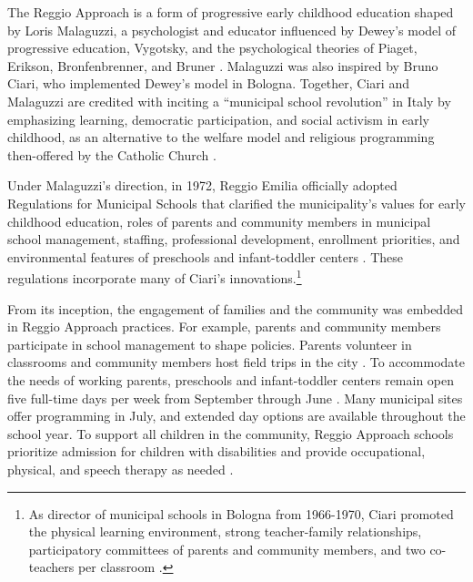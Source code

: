 The Reggio Approach is a form of progressive early childhood education shaped by Loris Malaguzzi, a psychologist and educator influenced by Dewey's model of progressive education, Vygotsky, and the psychological theories of Piaget, Erikson, Bronfenbrenner, and Bruner \citep{Rinaldi_2006_ReggioEmilia_BOOK,Cagliari-etal-eds_2016_BOOK_Loris-Malaguzzi}. Malaguzzi was also inspired by Bruno Ciari, who implemented Dewey's model in Bologna. Together, Ciari and Malaguzzi are credited with inciting a ``municipal school revolution'' in Italy by emphasizing learning, democratic participation, and social activism in early childhood, as an alternative to the welfare model and religious programming then-offered by the Catholic Church \citep{Lazzari_2012_Euro-J-Edu,Cagliari-etal-eds_2016_BOOK_Loris-Malaguzzi}.

Under Malaguzzi's direction, in 1972, Reggio Emilia officially adopted Regulations for Municipal Schools that clarified the municipality's values for early childhood education, roles of parents and community members in municipal school management, staffing, professional development, enrollment priorities, and environmental features of preschools and infant-toddler centers \citep{Giaroni_1972_Regulations-Municipal-EC-Schools}. These regulations incorporate many of Ciari's innovations.\footnote{As director of municipal schools in Bologna from 1966-1970, Ciari promoted the physical learning environment, strong teacher-family relationships, participatory committees of parents and community members, and two co-teachers per classroom \citep{Edwards-etal-eds_1998_Hundred-Languages}.} 

From its inception, the engagement of families and the community was embedded in Reggio Approach practices. For example, parents and community members participate in school management to shape policies. Parents volunteer in classrooms and community members host field trips in the city \citep{CEHD_2016_Historical-Analysis,Cagliari-etal-eds_2016_BOOK_Loris-Malaguzzi}. To accommodate the needs of working parents, preschools and infant-toddler centers remain open five full-time days per week from September through June \citep{Giudici-Nicolosi_2014_Reggio-Approach}. Many municipal sites offer programming in July, and extended day options are available throughout the school year. To support all children in the community, Reggio Approach schools prioritize admission for children with disabilities and provide occupational, physical, and speech therapy as needed \citep{Edwards-etal-eds_1998_Hundred-Languages,Giaroni_1972_Regulations-Municipal-EC-Schools}.

